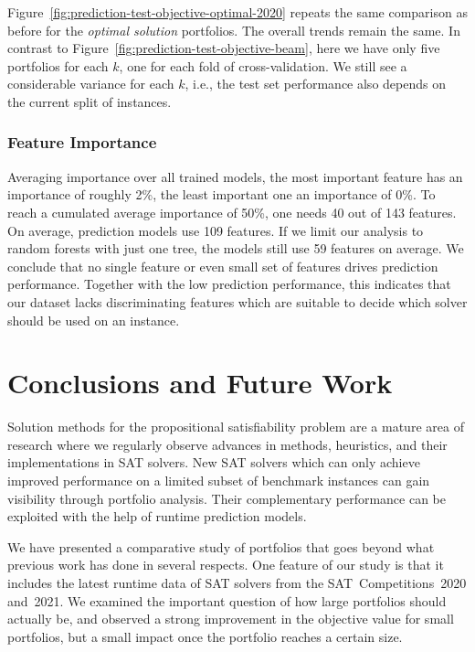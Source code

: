 \documentclass[conference]{IEEEtran}
\begin{document}
Figure~\ref{fig:prediction-test-objective-optimal-2020} repeats the same comparison as before for the \emph{optimal solution} portfolios.
The overall trends remain the same.
In contrast to Figure~\ref{fig:prediction-test-objective-beam}, here we have only five portfolios for each $k$, one for each fold of cross-validation.
We still see a considerable variance for each $k$, i.e., the test set performance also depends on the current split of instances.

\subsubsection{Feature Importance}

Averaging importance over all trained models, the most important feature has an importance of roughly 2\%, the least important one an importance of 0\%.
To reach a cumulated average importance of 50\%, one needs 40 out of 143 features.
On average, prediction models use 109 features.
If we limit our analysis to random forests with just one tree, the models still use 59 features on average.
We conclude that no single feature or even small set of features drives prediction performance.
Together with the low prediction performance, this indicates that our dataset lacks discriminating features which are suitable to decide which solver should be used on an instance.

\section{Conclusions and Future Work}
\label{sec:conclusion}

Solution methods for the propositional satisfiability problem are a mature area of research where we regularly observe advances in methods, heuristics, and their implementations in SAT solvers. 
New SAT solvers which can only achieve improved performance on a limited subset of benchmark instances can gain visibility through portfolio analysis. 
Their complementary performance can be exploited with the help of runtime prediction models. 

We have presented a comparative study of portfolios that goes beyond what previous work has done in several respects.
One feature of our study is that it includes the latest runtime data of SAT solvers from the SAT~Competitions~2020 and~2021. 
We examined the important question of how large portfolios should actually be, and observed a strong improvement in the objective value for small portfolios, but a small impact once the portfolio reaches a certain size.
\end{document}
